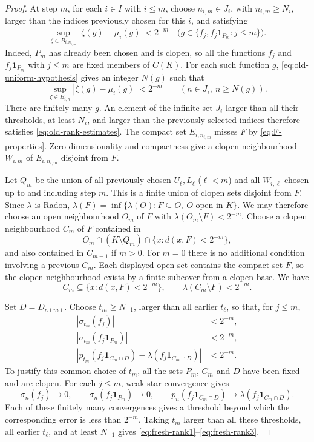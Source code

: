 \documentclass[a4paper,11pt]{amsart}
\theoremstyle{plain}
\theoremstyle{definition}
\theoremstyle{remark}
\newcommand{\one}{\mathbf 1}
\numberwithin{equation}{section}
\begin{document}
\begin{proof}
At step $m$, for each $i\in I$ with $i\leqslant m$, choose
$n_{i,m}\in J_i$, with $n_{i,m}\geqslant N_i$, larger than the indices
previously chosen for this $i$, and satisfying
\begin{equation}\label{eq:old-rank-estimates}
 \sup_{\zeta\in B_{i,n_{i,m}}}|\zeta(g)-\mu_i(g)|<2^{-m}
 \quad\bigl(g\in\{f_j,f_j\one_{P_m}:j\leqslant m\}\bigr).
\end{equation}
Indeed, $P_m$ has already been chosen and is clopen, so all the
functions $f_j$ and $f_j\one_{P_m}$ with $j\leqslant m$ are fixed
members of $C(K)$. For each such function $g$,
\eqref{eq:old-uniform-hypothesis} gives an integer $N(g)$ such that
\[
 \sup_{\zeta\in B_{i,n}}|\zeta(g)-\mu_i(g)|<2^{-m}
 \qquad(n\in J_i,\ n\geqslant N(g)).
\]
There are finitely many $g$. An element of the infinite set $J_i$
larger than all their thresholds, at least $N_i$, and larger than the
previously selected indices therefore satisfies
\eqref{eq:old-rank-estimates}.
The compact set $E_{i,n_{i,m}}$ misses $F$ by
\eqref{eq:F-properties}. Zero-dimensionality and compactness give a
clopen neighbourhood $W_{i,m}$ of $E_{i,n_{i,m}}$ disjoint from $F$.

Let $Q_m$ be the union of all previously chosen $U_\ell,L_\ell$
($\ell<m$) and all $W_{i,\ell}$ chosen up to and including step $m$.
This is a finite union of clopen sets disjoint from $F$.
Since $\lambda$ is Radon,
$\lambda(F)=\inf\{\lambda(O):F\subseteq O,\ O\text{ open in }K\}$.
We may therefore choose an open neighbourhood $O_m$ of $F$ with
$\lambda(O_m\setminus F)<2^{-m}$. Choose a clopen neighbourhood $C_m$
of $F$ contained in
\[
 O_m\cap(K\setminus Q_m)\cap\{x:d(x,F)<2^{-m}\},
\]
and also contained in $C_{m-1}$ if $m>0$. For $m=0$ there is no
additional condition involving a previous $C_m$. Each displayed open
set contains the compact set $F$, so the clopen neighbourhood exists
by a finite subcover from a clopen base. We have
\begin{equation}\label{eq:C-rank-estimates}
 C_m\subseteq\{x:d(x,F)<2^{-m}\},\qquad
 \lambda(C_m\setminus F)<2^{-m}.
\end{equation}

Set $D=D_{\kappa(m)}$. Choose $t_m\geqslant N_{-1}$, larger than all
earlier $t_\ell$, so that, for $j\leqslant m$,
\begin{align}
 |\sigma_{t_m}(f_j)|&<2^{-m},\label{eq:fresh-rank1}\\
 |\sigma_{t_m}(f_j\one_{P_m})|&<2^{-m},\label{eq:fresh-rank2}\\
 |p_{t_m}(f_j\one_{C_m\cap D})
       -\lambda(f_j\one_{C_m\cap D})|&<2^{-m}.
       \label{eq:fresh-rank3}
\end{align}
To justify this common choice of $t_m$, all the sets $P_m$, $C_m$ and
$D$ have been fixed and are clopen. For each $j\leqslant m$, weak-star
convergence gives
\[
 \sigma_n(f_j)\longrightarrow0,\qquad
 \sigma_n(f_j\one_{P_m})\longrightarrow0,\qquad
 p_n(f_j\one_{C_m\cap D})
   \longrightarrow\lambda(f_j\one_{C_m\cap D}).
\]
Each of these finitely many convergences gives a threshold beyond which
the corresponding error is less than $2^{-m}$. Taking $t_m$ larger
than all these thresholds, all earlier $t_\ell$, and at least $N_{-1}$
gives \eqref{eq:fresh-rank1}--\eqref{eq:fresh-rank3}.


\end{proof}
\end{document}
